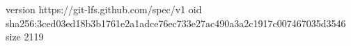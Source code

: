 version https://git-lfs.github.com/spec/v1
oid sha256:3ced03ed18b3b1761e2a1adce76ec733e27ac490a3a2c1917c007467035d3546
size 2119

